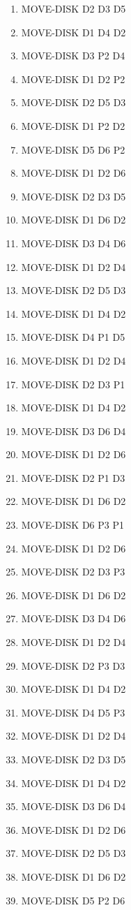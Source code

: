 \documentclass[12pt]{article}
\begin{document}
\begin{appendix}
\begin{itemize}
\begin{enumerate}
	\item  MOVE-DISK D2 D3 D5
	\item  MOVE-DISK D1 D4 D2
	\item  MOVE-DISK D3 P2 D4
	\item  MOVE-DISK D1 D2 P2
	\item  MOVE-DISK D2 D5 D3
	\item  MOVE-DISK D1 P2 D2
	\item  MOVE-DISK D5 D6 P2
	\item  MOVE-DISK D1 D2 D6
	\item  MOVE-DISK D2 D3 D5
	\item  MOVE-DISK D1 D6 D2
	\item  MOVE-DISK D3 D4 D6
	\item  MOVE-DISK D1 D2 D4
	\item  MOVE-DISK D2 D5 D3
	\item  MOVE-DISK D1 D4 D2
	\item  MOVE-DISK D4 P1 D5
	\item  MOVE-DISK D1 D2 D4
	\item  MOVE-DISK D2 D3 P1
	\item  MOVE-DISK D1 D4 D2
	\item  MOVE-DISK D3 D6 D4
	\item  MOVE-DISK D1 D2 D6
	\item  MOVE-DISK D2 P1 D3
	\item  MOVE-DISK D1 D6 D2
	\item  MOVE-DISK D6 P3 P1
	\item  MOVE-DISK D1 D2 D6
	\item  MOVE-DISK D2 D3 P3
	\item  MOVE-DISK D1 D6 D2
	\item  MOVE-DISK D3 D4 D6
	\item  MOVE-DISK D1 D2 D4
	\item  MOVE-DISK D2 P3 D3
	\item  MOVE-DISK D1 D4 D2
	\item  MOVE-DISK D4 D5 P3
	\item  MOVE-DISK D1 D2 D4
	\item  MOVE-DISK D2 D3 D5
	\item  MOVE-DISK D1 D4 D2
	\item  MOVE-DISK D3 D6 D4
	\item  MOVE-DISK D1 D2 D6
	\item  MOVE-DISK D2 D5 D3
	\item  MOVE-DISK D1 D6 D2
	\item  MOVE-DISK D5 P2 D6

\end{enumerate}
\end{itemize}
\end{appendix}
\end{document}
